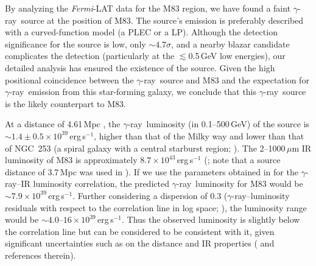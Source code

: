 \documentclass[twocolumn]{aastex631}
\newcommand{\fermi}{\textit{Fermi}}
\newcommand{\gr}{$\gamma$-ray}
\begin{document}
By analyzing the \fermi-LAT data for the M83 region, we have found a faint
\gr\ source at the position of M83. The source's emission is
preferably described with a curved-function model (a PLEC or a LP). Although
the detection significance for the source is low, only $\sim 4.7\sigma$, and
a nearby blazar candidate complicates the detection (particularly at the
$\lesssim$0.5\,GeV low energies), our 
detailed analysis has ensured the existence of the source. Given the high
positional coincidence between the \gr\ source and M83 and the expectation
for \gr\ emission from this star-forming galaxy, we conclude that this 
\gr\ source is the likely counterpart to M83.

At a distance of 4.61\,Mpc \citep{sah+06}, the \gr\ luminosity 
(in 0.1--500\,GeV) of the source is 
$\sim 1.4\pm0.5 \times 10^{39}$\,erg\,s$^{-1}$, higher than that of
the Milky way \citep{ack+12} and lower than that of NGC~253
(a spiral galaxy with a central starburst region; \citealt{abd+10a,aje+20}).
The 2--1000\,$\mu$m IR luminosity of M83 is approximately
$8.7\times 10^{43}$\,erg\,s$^{-1}$ (\citealt{ack+12}; note that a source
distance of 3.7\,Mpc was used in \citealt{ack+12}). 
If we use the parameters obtained in \citet{aje+20} for the \gr--IR
luminosity correlation, the predicted
\gr\ luminosity for M83 would be $\sim 7.9\times 10^{39}$\,erg\,s$^{-1}$.
Further considering a dispersion of 0.3 (\gr--luminosity residuals with 
respect to
the correlation line in log space; \citealt{ack+12,aje+20}), the luminosity
range would be $\sim 4.0$--$16\times 10^{39}$\,erg\,s$^{-1}$. Thus the observed
luminosity is slightly below the correlation line but can be considered to
be consistent with it, given significant uncertainties such as on 
the distance and IR properties (\citealt{aje+20} and references therein).
\end{document}
